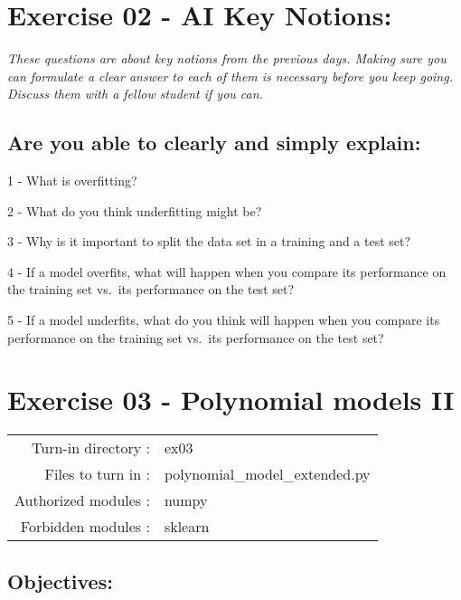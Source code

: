 \documentclass[]{article}
\begin{document}
\clearpage

\hypertarget{exercise-02---ai-key-notions-1}{%
\section{Exercise 02 - AI Key
Notions:}\label{exercise-02---ai-key-notions-1}}

\emph{These questions are about key notions from the previous days.
Making sure you can formulate a clear answer to each of them is
necessary before you keep going. Discuss them with a fellow student if
you can.}

\hypertarget{are-you-able-to-clearly-and-simply-explain}{%
\subsection{Are you able to clearly and simply
explain:}\label{are-you-able-to-clearly-and-simply-explain}}

1 - What is overfitting?

2 - What do you think underfitting might be?

3 - Why is it important to split the data set in a training and a test
set?

4 - If a model overfits, what will happen when you compare its
performance on the training set vs.~its performance on the test set?

5 - If a model underfits, what do you think will happen when you compare
its performance on the training set vs.~its performance on the test set?

\clearpage

\hypertarget{exercise-03---polynomial-models-ii-1}{%
\section{Exercise 03 - Polynomial models
II}\label{exercise-03---polynomial-models-ii-1}}

\begin{longtable}[]{@{}rl@{}}
\toprule
\endhead
Turn-in directory : & ex03\tabularnewline
Files to turn in : & polynomial\_model\_extended.py\tabularnewline
Authorized modules : & numpy\tabularnewline
Forbidden modules : & sklearn\tabularnewline
\bottomrule
\end{longtable}

\hypertarget{objectives-2}{%
\subsection{Objectives:}\label{objectives-2}}
\end{document}
